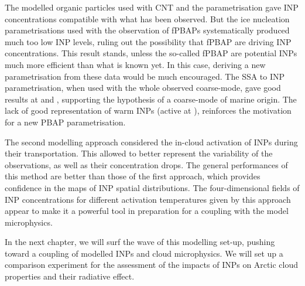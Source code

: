     The modelled organic particles used with CNT and the \citet{wilson_marine_2015} parametrisation gave INP concentrations compatible with what has been observed.
    But the ice nucleation parametrisations used with the observation of fPBAPs systematically produced much too low INP levels, ruling out the possibility that fPBAP are driving INP concentrations. This result stands, unless the so-called fPBAP are potential INPs much more efficient than what is known yet. In this case, deriving a new parametrisation from these data would be much encouraged.
    The SSA to INP \citet{mccluskey_marine_2018} parametrisation, when used with the whole observed coarse-mode, gave good results at  and , supporting the hypothesis of a coarse-mode of marine origin. The lack of good representation of warm INPs (active at ), reinforces the motivation for a new PBAP parametrisation.

    The second modelling approach considered the in-cloud activation of INPs during their transportation. This allowed to better represent the variability of the observations, as well as their concentration drops.
    The general performances of this method are better than those of the first approach, which provides confidence in the maps of INP spatial distributions. The four-dimensional fields of INP concentrations for different activation temperatures given by this approach appear to make it a powerful tool in preparation for a coupling with the model microphysics.
    \vspace{\baselineskip}

    In the next chapter, we will surf the wave of this modelling set-up, pushing toward a coupling of modelled INPs and cloud microphysics. We will set up a comparison experiment for the assessment of the impacts of INPs on Arctic cloud properties and their radiative effect. 


    \vspace{\baselineskip}

\stopcontents[chapters]
